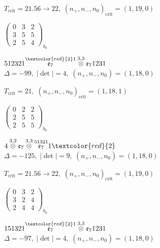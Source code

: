 \documentclass[10pt]{article}
\begin{document}
\hspace{1em}$T_{\text{crit}}=21.56 \to 22,\; (n_+,n_-,n_0)_{\text{crit}}=(1,19,0)$

\hspace{2em}$\left(\begin{smallmatrix}0 & 3 & 2 \\ 3 & 5 & 5 \\ 2 & 5 & 4\end{smallmatrix}\right)_{\!b_0}$

\smallskip

$512321\overset{\textcolor{red}{2}1}{\mathfrak{e}_7}\overset{3,3}{\otimes}\mathfrak{e}_71231$ \quad $\Delta=-99,\; |\det|=4,\; (n_+,n_-,n_0)=(1,18,0)$

\hspace{1em}$T_{\text{crit}}=21,\; (n_+,n_-,n_0)_{\text{crit}}=(1,18,1)$

\hspace{2em}$\left(\begin{smallmatrix}0 & 2 & 2 \\ 2 & 5 & 5 \\ 2 & 5 & 5\end{smallmatrix}\right)_{\!b_0}$

\smallskip

$4\overset{3,2}{\otimes}\mathfrak{e}_7\overset{3,3}{\otimes}\overset{51321}{\mathfrak{e}_7}1\textcolor{red}{2}$ \quad $\Delta=-125,\; |\det|=9,\; (n_+,n_-,n_0)=(1,18,0)$

\hspace{1em}$T_{\text{crit}}=21.56 \to 22,\; (n_+,n_-,n_0)_{\text{crit}}=(1,19,0)$

\hspace{2em}$\left(\begin{smallmatrix}0 & 3 & 2 \\ 3 & 2 & 4 \\ 2 & 4 & 4\end{smallmatrix}\right)_{\!b_0}$

\smallskip

$151321\overset{\textcolor{red}{2}1}{\mathfrak{e}_7}\overset{3,3}{\otimes}\mathfrak{e}_71231$ \quad $\Delta=-97,\; |\det|=4,\; (n_+,n_-,n_0)=(1,18,0)$
\end{document}
